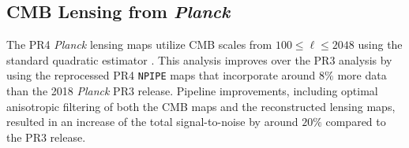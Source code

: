 \documentclass[twocolumn]{aastex631}
\begin{document}
{\subsection{CMB Lensing from \textit{Planck}} \label{planck_map}
The PR4 \textit{Planck} lensing maps utilize CMB scales from $100\leq\ell\leq2048$ using the standard quadratic estimator \citep{Carron:2022}. This analysis improves over the PR3 analysis by using the reprocessed PR4 \texttt{NPIPE} maps that incorporate around $8\%$ more data than the 2018 \textit{Planck} PR3 release. Pipeline improvements, including optimal anisotropic filtering of both the CMB maps and the reconstructed lensing maps, resulted in an increase of the total signal-to-noise by around $20\%$ compared to the PR3 release.


}
\end{document}
